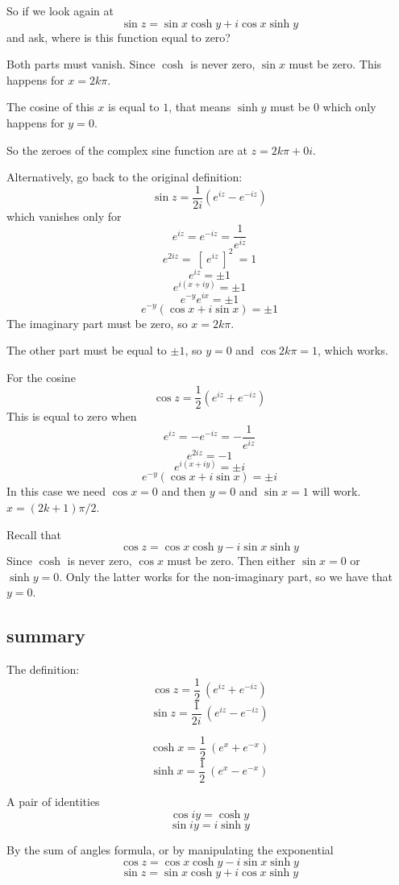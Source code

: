 \documentclass[11pt, oneside]{article}
\begin{document}
So if we look again at 
\[ \sin z = \sin x \cosh y + i \cos x \sinh y \]
and ask, where is this function equal to zero?  

Both parts must vanish.  Since $\cosh$ is never zero, $\sin x$ must be zero.  This happens for $x = 2k \pi$.  

The cosine of this $x$ is equal to $1$, that means $\sinh y$ must be $0$ which only happens for $y = 0$.

So the zeroes of the complex sine function are at $z = 2k \pi + 0i$.

Alternatively, go back to the original definition:
\[ \sin z = \frac{1}{2i} (e^{iz} - e^{-iz}) \]
which vanishes only for 
\[ e^{iz} = e^{-iz} = \frac{1}{e^{iz}} \]
\[ e^{2iz} = \ [ \ e^{iz} \ ]^2 \ = 1 \]
\[ e^{iz} = \pm 1 \]
\[ e^{i(x + iy)} = \pm 1 \]
\[ e^{-y}e^{ix} = \pm 1 \]
\[ e^{-y} (\cos x + i \sin x) = \pm 1 \]
The imaginary part must be zero, so $x = 2k \pi$.

The other part must be equal to $\pm 1$, so $y = 0$ and $\cos 2k \pi = 1$, which works.

For the cosine
\[ \cos z = \frac{1}{2} (e^{iz} + e^{-iz}) \]
This is equal to zero when
\[ e^{iz} = - e^{-iz} = -\frac{1}{e^{iz}} \]
\[ e^{2iz} = -1 \]
\[ e^{i(x + iy)} = \pm i \]
\[ e^{-y} (\cos x + i \sin x) = \pm i \]
In this case we need $\cos x = 0$ and then $y=0$ and $\sin x = 1$ will work.  $x = (2k + 1)\pi / 2$.

Recall that
\[ \cos z = \cos x \cosh y - i \sin x \sinh y \]
Since $\cosh$ is never zero, $\cos x$ must be zero.  Then either $\sin x = 0$ or $\sinh y = 0$.  Only the latter works for the non-imaginary part, so we have that $y = 0$.

\subsection*{summary}

The definition:
\[ \cos z = \frac{1}{2} \ (e^{iz} + e^{-iz}) \]
\[ \sin z = \frac{1}{2i} \ (e^{iz} - e^{-iz}) \]

\[ \cosh x =  \frac{1}{2} \ (e^{x}+ e^{-x}) \]
\[ \sinh x =  \frac{1}{2} \ (e^{x} - e^{-x}) \]

A pair of identities
\[ \cos iy = \cosh y \]
\[ \sin iy =  i \sinh y \]

By the sum of angles formula, or by manipulating the exponential
\[ \cos z = \cos x \cosh y - i \sin x \sinh y \]
\[ \sin z = \sin x \cosh y + i \cos x \sinh y \]
\end{document}
